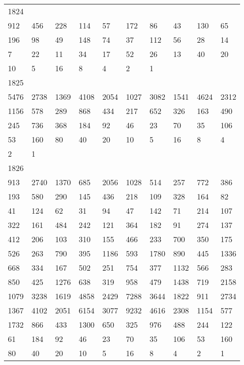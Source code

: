 \begin{longtable}{*{10}{l}}
1824&&&&&&&&&\\
912& 456& 228& 114& 57& 172& 86& 43& 130& 65\\
196& 98& 49& 148& 74& 37& 112& 56& 28& 14\\
7& 22& 11& 34& 17& 52& 26& 13& 40& 20\\
10& 5& 16& 8& 4& 2& 1& \\

1825&&&&&&&&&\\
5476& 2738& 1369& 4108& 2054& 1027& 3082& 1541& 4624& 2312\\
1156& 578& 289& 868& 434& 217& 652& 326& 163& 490\\
245& 736& 368& 184& 92& 46& 23& 70& 35& 106\\
53& 160& 80& 40& 20& 10& 5& 16& 8& 4\\
2& 1& \\

1826&&&&&&&&&\\
913& 2740& 1370& 685& 2056& 1028& 514& 257& 772& 386\\
193& 580& 290& 145& 436& 218& 109& 328& 164& 82\\
41& 124& 62& 31& 94& 47& 142& 71& 214& 107\\
322& 161& 484& 242& 121& 364& 182& 91& 274& 137\\
412& 206& 103& 310& 155& 466& 233& 700& 350& 175\\
526& 263& 790& 395& 1186& 593& 1780& 890& 445& 1336\\
668& 334& 167& 502& 251& 754& 377& 1132& 566& 283\\
850& 425& 1276& 638& 319& 958& 479& 1438& 719& 2158\\
1079& 3238& 1619& 4858& 2429& 7288& 3644& 1822& 911& 2734\\
1367& 4102& 2051& 6154& 3077& 9232& 4616& 2308& 1154& 577\\
1732& 866& 433& 1300& 650& 325& 976& 488& 244& 122\\
61& 184& 92& 46& 23& 70& 35& 106& 53& 160\\
80& 40& 20& 10& 5& 16& 8& 4& 2& 1\\


\end{longtable}
